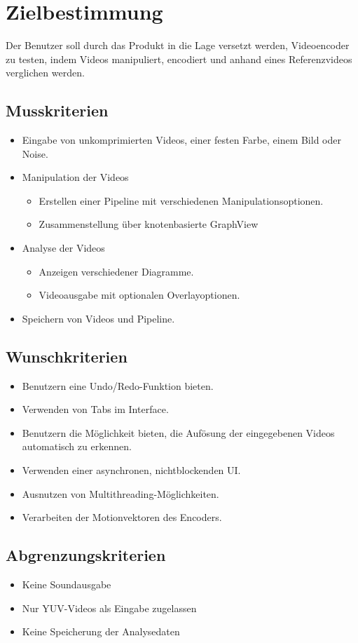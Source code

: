 \section{Zielbestimmung}

Der Benutzer soll durch das Produkt in die Lage versetzt werden, Videoencoder zu testen, indem Videos manipuliert, encodiert und anhand eines Referenzvideos verglichen werden.

\subsection{Musskriterien}

\begin{itemize}
	\item Eingabe von unkomprimierten Videos, einer festen Farbe, einem Bild oder Noise.
	\item Manipulation der Videos
	\begin{itemize}
		\item Erstellen einer Pipeline mit verschiedenen Manipulationsoptionen.
		\item Zusammenstellung über knotenbasierte GraphView
	\end{itemize}
	\item Analyse der Videos
	\begin{itemize}
		\item Anzeigen verschiedener Diagramme.
		\item Videoausgabe mit optionalen Overlayoptionen.
	\end{itemize}
	\item Speichern von Videos und Pipeline.
\end{itemize}

\subsection{Wunschkriterien}

\begin{itemize}
	\item Benutzern eine Undo/Redo-Funktion bieten.
	\item Verwenden von Tabs im Interface.
	\item Benutzern die Möglichkeit bieten, die Aufösung der eingegebenen Videos automatisch zu erkennen.
	\item Verwenden einer asynchronen, nichtblockenden UI.
	\item Ausnutzen von Multithreading-Möglichkeiten.
	\item Verarbeiten der Motionvektoren des Encoders.
\end{itemize}

\subsection{Abgrenzungskriterien}

\begin{itemize}
	\item Keine Soundausgabe
	\item Nur YUV-Videos als Eingabe zugelassen
	\item Keine Speicherung der Analysedaten
\end{itemize}
